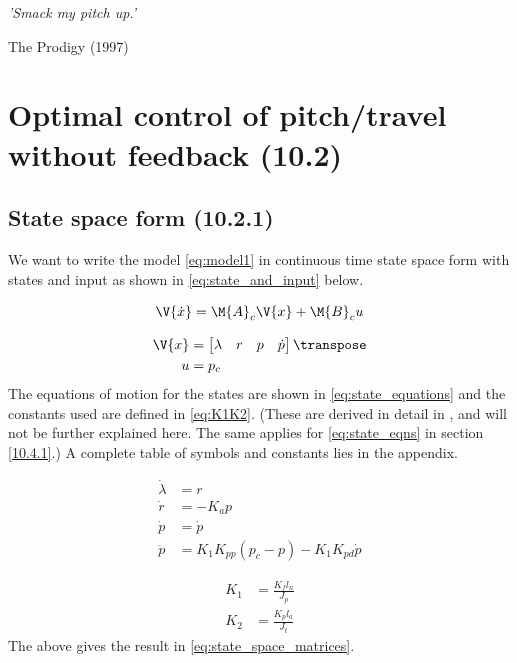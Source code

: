 \epigraph{\textit{'Smack my pitch up.'}}{The Prodigy (1997)}

\section{Optimal control of pitch/travel without feedback (10.2)}

\subsection{State space form (10.2.1)}
We want to write the model \eqref{eq:model1} in continuous time state space form with states and input as shown in \eqref{eq:state_and_input} below.

\begin{equation}\label{eq:model1}
	\V{\dot{x}} = \M{A}_{c}\V{x} + \M{B}_{c}u
\end{equation}

\begin{equation}\label{eq:state_and_input}
\begin{aligned}
	\V{x} 	&= \begin{bmatrix}\lambda & r & p & \dot{p} \end{bmatrix}\transpose \\
	u 		&= p_{c}
\end{aligned}
\end{equation}
The equations of motion for the states are shown in \eqref{eq:state_equations} and the constants used are defined in \eqref{eq:K1K2}. (These are derived in detail in \cite{_helicopter_2015}, and will not be further explained here. The same applies for \eqref{eq:state_eqns} in section \ref{10.4.1}.) A complete table of symbols and constants lies in the appendix. 

\begin{equation}\label{eq:state_equations}
\begin{aligned}
	\dot{\lambda} 	&= r \\
	\dot{r} 		&= - K_{a} p \\
	\dot{p} 		&= \dot{p} \\
	\ddot{p} 		&= K_{1} K_{pp} (p_{c} - p) - K_{1} K_{pd} \dot{p}
\end{aligned}
\end{equation}

\begin{equation}\label{eq:K1K2}
\begin{aligned}
	K_{1} &= \frac{K_{f} l_{n}}{J_{p}} \\
	K_{2} &= \frac{K_{p} l_{a}}{J_{t}}
\end{aligned}
\end{equation}
The above gives the result in \eqref{eq:state_space_matrices}.

